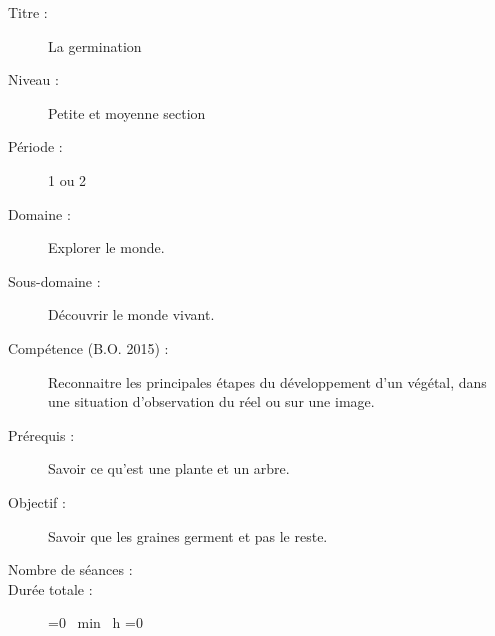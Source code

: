 \begin{description}
\item[Titre :] La germination
\item[Niveau :] Petite et moyenne section
\item[Période :] 1 ou 2
\item[Domaine :] Explorer le monde.
\item[Sous-domaine :] Découvrir le monde vivant.
\item[Compétence\footnotemark{} (B.O. 2015)	 :] Reconnaitre les principales étapes du développement d’un végétal, dans une situation d’observation
du réel ou sur une image.
\item[Prérequis :] Savoir ce qu’est une plante et un arbre.
\item[Objectif :] Savoir que les graines germent et pas le reste.
\item[Nombre de séances :] \theNbSeance
\item[Durée totale :] 
\ifnum\value{DureeTotaleHeure}=0 %
\theDureeTotaleMinutes{}~min
\else\theDureeTotaleHeure{}~h 
	\ifnum\value{DureeTotaleMinutes}=0 %
	\else\theDureeTotaleMinutes
	\fi
\fi
\end{description}